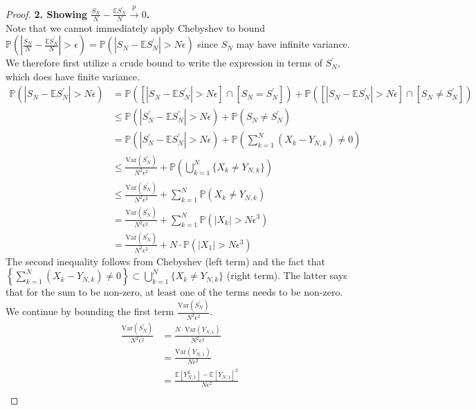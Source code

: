 \documentclass[12pt]{article}
\newcommand*{\abs}[1]{\left\lvert#1\right\rvert}
\newcommand{\E}{\mathbb{E}}
\newcommand{\Var}{\mathrm{Var}}
\newcommand{\Prob}{\mathbb{P}}
\begin{document}
\begin{proof}
 \bigskip
 \noindent
 \textbf{2. Showing $\frac{S_N}{N} - \frac{\E S_N^\prime}{N} \overset{p}{\to} 0$.} \\
 Note that we cannot immediately apply Chebyshev to bound $\Prob\left(\abs{\frac{S_N}{N} - \frac{\E S_N^\prime}{N}} > \epsilon\right) = \Prob\left(\abs{S_N - \E S_N^\prime} > N\epsilon\right)$ since 
 $S_N$ may have infinite variance. We therefore first utilize a crude bound to write the expression in terms of $S_N^\prime$, which does have finite variance. 
 \begin{align*}
 \Prob\left(\abs{S_N - \E S_N^\prime} > N\epsilon\right) &= \Prob\left(\left[\abs{S_N - \E S_N^\prime} > N\epsilon\right] \cap \left[S_N = S_N^\prime\right] \right) +  \Prob\left(\left[\abs{S_N - \E S_N^\prime} > N\epsilon\right] \cap \left[S_N \neq S_N^\prime\right] \right) \\
 										    &\leq \Prob\left(\abs{S^\prime_N - \E S_N^\prime} > N\epsilon \right) + \Prob(S_N \neq S_N^\prime) \\
										    &= \Prob\left(\abs{S^\prime_N - \E S_N^\prime} > N\epsilon \right) + \Prob\left(\sum_{k = 1}^{N} (X_k - Y_{N,k}) \neq 0\right) \\
										    &\leq \frac{\Var(S_N^\prime)}{N^2 \epsilon^2} + \Prob\left(\bigcup_{k = 1}^{N} \{X_k \neq Y_{N,k}\} \right) \\
										    &\leq \frac{\Var(S_N^\prime)}{N^2 \epsilon^2} + \sum_{k = 1}^{N} \Prob(X_k \neq Y_{N,k}) \\
										    &= \frac{\Var(S_N^\prime)}{N^2 \epsilon^2} + \sum_{k = 1}^{N} \Prob(\abs{X_k} > N\epsilon^3) \\
										    &= \frac{\Var(S_N^\prime)}{N^2 \epsilon^2} + N \cdot \Prob(\abs{X_1} > N\epsilon^3)
 \end{align*}
 The second inequality follows from Chebyshev (left term) and the fact that $\left\{\sum_{k = 1}^{N} (X_k - Y_{N,k}) \neq 0\right\} \subset \bigcup_{k = 1}^{N} \{X_k \neq Y_{N,k}\}$ (right term). The latter says that for the sum to 
 be non-zero, at least one of the terms needs to be non-zero. We continue by bounding the first term $\frac{\Var(S_N^\prime)}{N^2 \epsilon^2}$. 
 \begin{align*}
 \frac{\Var(S_N^\prime)}{N^2 \epsilon^2} &= \frac{N \cdot \Var(Y_{N,1})}{N^2 \epsilon^2} \\
 							      &=  \frac{\Var(Y_{N,1})}{N \epsilon^2} \\
							      &= \frac{\E[Y_{N,1}^2] - \E[Y_{N,1}]^2}{N\epsilon^2} \\

\end{align*}
\end{proof}
\end{document}
